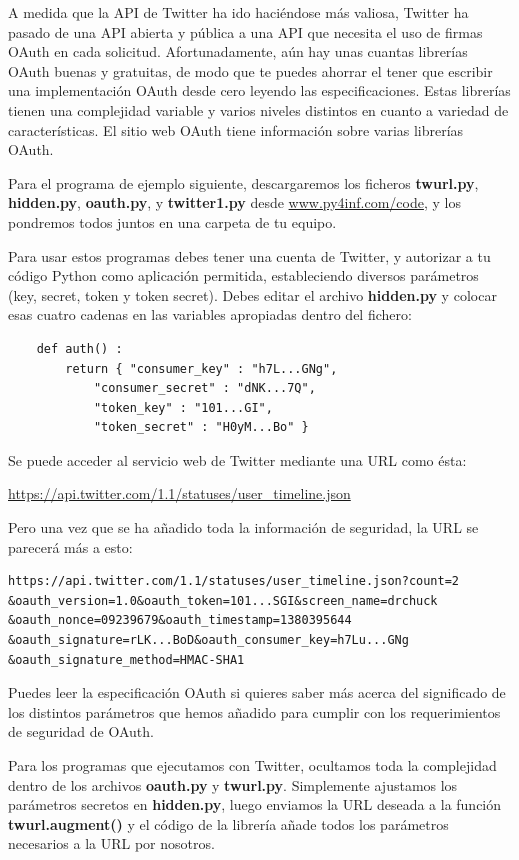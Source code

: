 A medida que la API de Twitter ha ido haciéndose más valiosa, Twitter
ha pasado de una API abierta y pública a una API que necesita
el uso de firmas OAuth en cada solicitud. Afortunadamente,
aún hay unas cuantas librerías OAuth buenas y gratuitas,
de modo que te puedes ahorrar el tener que escribir una implementación OAuth
desde cero leyendo las especificaciones. Estas librerías tienen
una complejidad variable y varios niveles distintos en cuanto a variedad de características.
El sitio web OAuth tiene información sobre varias librerías OAuth.

Para el programa de ejemplo siguiente, descargaremos los ficheros
{\bf twurl.py}, {\bf hidden.py}, 
{\bf oauth.py}, 
y
{\bf twitter1.py} desde
\url{www.py4inf.com/code}, y los pondremos todos juntos en una carpeta
de tu equipo.

Para usar estos programas debes tener una cuenta de Twitter,
y autorizar a tu código Python como aplicación permitida,
estableciendo diversos parámetros (key, secret, token y token secret). Debes editar
el archivo {\bf hidden.py} y colocar esas cuatro cadenas en las
variables apropiadas dentro del fichero:

\beforeverb
\begin{verbatim}
    def auth() :
        return { "consumer_key" : "h7L...GNg",
            "consumer_secret" : "dNK...7Q",
            "token_key" : "101...GI",
            "token_secret" : "H0yM...Bo" }
\end{verbatim}
\afterverb
%
Se puede acceder al servicio web de Twitter mediante una URL como ésta:

\url{https://api.twitter.com/1.1/statuses/user_timeline.json}

Pero una vez que se ha añadido toda la información de seguridad, la URL
se parecerá más a esto:

\beforeverb
\begin{verbatim}
https://api.twitter.com/1.1/statuses/user_timeline.json?count=2
&oauth_version=1.0&oauth_token=101...SGI&screen_name=drchuck
&oauth_nonce=09239679&oauth_timestamp=1380395644
&oauth_signature=rLK...BoD&oauth_consumer_key=h7Lu...GNg
&oauth_signature_method=HMAC-SHA1
\end{verbatim}
\afterverb
%
Puedes leer la especificación OAuth si quieres saber más
acerca del significado de los distintos parámetros que
hemos añadido para cumplir con los requerimientos de seguridad de OAuth.

Para los programas que ejecutamos con Twitter, ocultamos toda la
complejidad dentro de los archivos {\bf oauth.py} y {\bf twurl.py}.
Simplemente ajustamos los parámetros secretos en {\bf hidden.py}, luego
enviamos la URL deseada a la función {\bf twurl.augment()}
y el código de la librería añade todos los parámetros
necesarios a la URL por nosotros.

